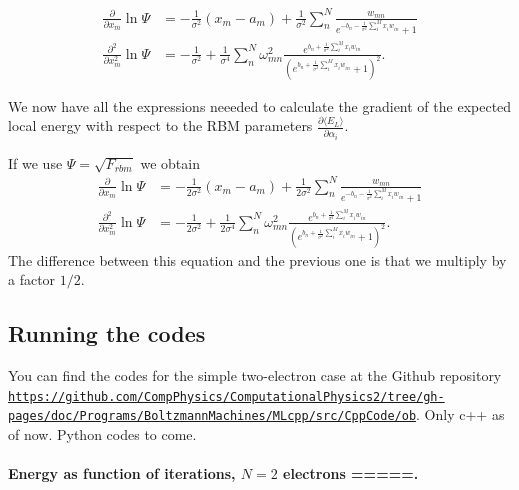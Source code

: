 \documentclass[%
oneside,                 %
final,                   %
10pt]{article}
\begin{document}
\begin{align}
	\frac{\partial}{\partial x_m} \ln\Psi
	&= - \frac{1}{\sigma^2}(x_m - a_m) + \frac{1}{\sigma^2} \sum_n^N \frac{w_{mn}}{e^{-b_n - \frac{1}{\sigma^2}\sum_i^M x_i w_{in}} + 1} \\
	\frac{\partial^2}{\partial x_m^2} \ln\Psi
	&= - \frac{1}{\sigma^2} + \frac{1}{\sigma^4}\sum_n^N \omega_{mn}^2 \frac{e^{b_n + \frac{1}{\sigma^2}\sum_i^M x_i w_{in}}}{(e^{b_n + \frac{1}{\sigma^2}\sum_i^M x_i w_{in}} + 1)^2}.
\end{align}

We now have all the expressions neeeded to calculate the gradient of
the expected local energy with respect to the RBM parameters
$\frac{\partial \langle E_L \rangle}{\partial \alpha_i}$.

If we use $\Psi = \sqrt{F_{rbm}}$ we obtain
\begin{align}
	\frac{\partial}{\partial x_m} \ln\Psi
	&= - \frac{1}{2\sigma^2}(x_m - a_m) + \frac{1}{2\sigma^2} \sum_n^N
 	\frac{w_{mn}}{e^{-b_n-\frac{1}{\sigma^2}\sum_i^M x_i w_{in}} + 1}
	\\
	\frac{\partial^2}{\partial x_m^2} \ln\Psi
	&= - \frac{1}{2\sigma^2} + \frac{1}{2\sigma^4}\sum_n^N \omega_{mn}^2 \frac{e^{b_n + \frac{1}{\sigma^2}\sum_i^M x_i w_{in}}}{(e^{b_n + \frac{1}{\sigma^2}\sum_i^M x_i w_{in}} + 1)^2}.
\end{align}
The difference between this equation and the previous one is that we multiply by a factor $1/2$.





\subsection{Running the codes}

You can find the codes for the simple two-electron case at the Github repository \href{{https://github.com/CompPhysics/ComputationalPhysics2/tree/gh-pages/doc/Programs/BoltzmannMachines/MLcpp/src/CppCode/ob}}{\nolinkurl{https://github.com/CompPhysics/ComputationalPhysics2/tree/gh-pages/doc/Programs/BoltzmannMachines/MLcpp/src/CppCode/ob}}. Only c++ as of now. 
Python codes to come.

\paragraph{Energy as function of iterations, $N=2$ electrons  =====.}


\vspace{6mm}
\end{document}
